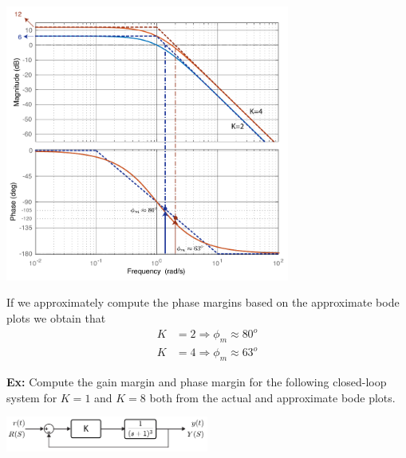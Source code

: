 \documentclass[twoside]{article}
\begin{document}
\begin{center}
\begin{minipage}[h]{\linewidth}
    \begin{center}
      \includegraphics[width=0.7\textwidth]{margin}
    \end{center}
\end{minipage}
\end{center}

If we approximately compute the phase margins based
on the approximate bode plots we obtain that 
%
\begin{align*}
  K &= 2 \Rightarrow \phi_m \approx 80^o 
  \\
  K &= 4 \Rightarrow \phi_m \approx 63^o 
\end{align*}

\vspace{12pt}

\textbf{Ex:} Compute the gain margin and phase margin 
for the following closed-loop system for $K = 1$ and $K = 8$
both from the actual and approximate bode plots. 

\begin{center}
\begin{minipage}[h]{\linewidth}
    \begin{center}
      \includegraphics[width=0.5\textwidth]{ex3block}
    \end{center}
\end{minipage}
\end{center}
\end{document}
